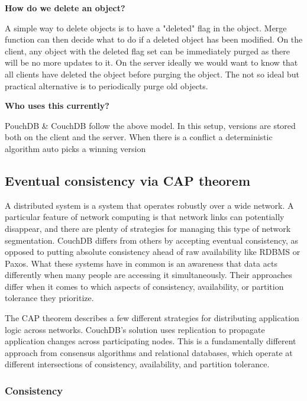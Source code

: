 \textbf{How do we delete an object?}

A simple way to delete objects is to have a "deleted" flag in the object. Merge function can then decide what to do if a deleted object has been modified. On the client, any object with the deleted flag set can be immediately purged as there will be no more updates to it. On the server ideally we would want to know that all clients have deleted the object before purging the object. The not so ideal but practical alternative is to periodically purge old objects.

\textbf{Who uses this currently?}

PouchDB & CouchDB follow the above model. In this setup, versions are stored both on the client and the server. When there is a conflict a deterministic algorithm auto picks a winning version


\subsection{Eventual consistency via CAP theorem}

A distributed system is a system that operates robustly over a wide network. A particular feature of network computing is that network links can potentially disappear, and there are plenty of strategies for managing this type of network segmentation. CouchDB differs from others by accepting eventual consistency, as opposed to putting absolute consistency ahead of raw availability like RDBMS or Paxos. What these systems have in common is an awareness that data acts differently when many people are accessing it simultaneously. Their approaches differ when it comes to which aspects of consistency, availability, or partition tolerance they prioritize.

The CAP theorem describes a few different strategies for distributing application logic across networks. CouchDB’s solution uses replication to propagate application changes across participating nodes. This is a fundamentally different approach from consensus algorithms and relational databases, which operate at different intersections of consistency, availability, and partition tolerance.

\subsubsection{Consistency}

